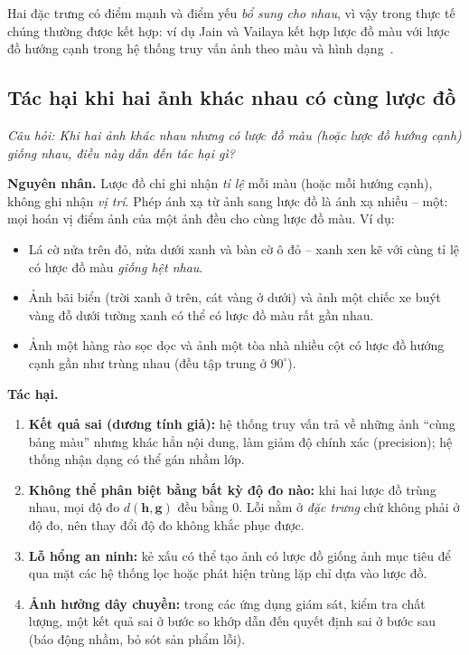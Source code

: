 Hai đặc trưng có điểm mạnh và điểm yếu \emph{bổ sung cho nhau}, vì vậy trong thực tế chúng thường được kết hợp: ví dụ Jain và Vailaya kết hợp lược đồ màu với lược đồ hướng cạnh trong hệ thống truy vấn ảnh theo màu và hình dạng~\citep{jain1996image}.

\subsection{Tác hại khi hai ảnh khác nhau có cùng lược đồ}
\label{subsec:w4_same_hist}

\textit{Câu hỏi: Khi hai ảnh khác nhau nhưng có lược đồ màu (hoặc lược đồ hướng cạnh) giống nhau, điều này dẫn đến tác hại gì?}

\textbf{Nguyên nhân.} Lược đồ chỉ ghi nhận \emph{tỉ lệ} mỗi màu (hoặc mỗi hướng cạnh), không ghi nhận \emph{vị trí}. Phép ánh xạ từ ảnh sang lược đồ là ánh xạ nhiều -- một: mọi hoán vị điểm ảnh của một ảnh đều cho cùng lược đồ màu. Ví dụ:
\begin{itemize}
    \item Lá cờ nửa trên đỏ, nửa dưới xanh và bàn cờ ô đỏ -- xanh xen kẽ với cùng tỉ lệ có lược đồ màu \emph{giống hệt nhau}.
    \item Ảnh bãi biển (trời xanh ở trên, cát vàng ở dưới) và ảnh một chiếc xe buýt vàng đỗ dưới tường xanh có thể có lược đồ màu rất gần nhau.
    \item Ảnh một hàng rào sọc dọc và ảnh một tòa nhà nhiều cột có lược đồ hướng cạnh gần như trùng nhau (đều tập trung ở $90^\circ$).
\end{itemize}

\textbf{Tác hại.}
\begin{enumerate}
    \item \textbf{Kết quả sai (dương tính giả):} hệ thống truy vấn trả về những ảnh ``cùng bảng màu'' nhưng khác hẳn nội dung, làm giảm độ chính xác (precision); hệ thống nhận dạng có thể gán nhầm lớp.
    \item \textbf{Không thể phân biệt bằng bất kỳ độ đo nào:} khi hai lược đồ trùng nhau, mọi độ đo $d(\mathbf{h}, \mathbf{g})$ đều bằng $0$. Lỗi nằm ở \emph{đặc trưng} chứ không phải ở độ đo, nên thay đổi độ đo không khắc phục được.
    \item \textbf{Lỗ hổng an ninh:} kẻ xấu có thể tạo ảnh có lược đồ giống ảnh mục tiêu để qua mặt các hệ thống lọc hoặc phát hiện trùng lặp chỉ dựa vào lược đồ.
    \item \textbf{Ảnh hưởng dây chuyền:} trong các ứng dụng giám sát, kiểm tra chất lượng, một kết quả sai ở bước so khớp dẫn đến quyết định sai ở bước sau (báo động nhầm, bỏ sót sản phẩm lỗi).
\end{enumerate}

